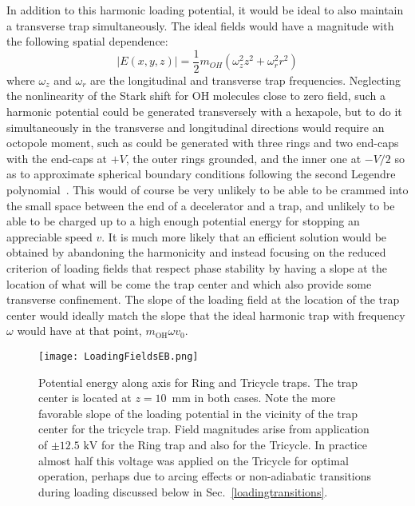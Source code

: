 In addition to this harmonic loading potential, it would be ideal to also maintain a transverse trap simultaneously. 
The ideal fields would have a magnitude with the following spatial dependence:
\begin{equation}
|E(x,y,z)| = \frac{1}{2}m_{OH}\left(\omega_z^2z^2 + \omega_r^2r^2\right)
\end{equation}
where $\omega_z$ and $\omega_r$ are the longitudinal and transverse trap frequencies.
Neglecting the nonlinearity of the Stark shift for OH molecules close to zero field, such a harmonic potential could be generated transversely with a hexapole, but to do it simultaneously in the transverse and longitudinal directions would require an octopole moment, such as could be generated with three rings and two end-caps with the end-caps at $+V$, the outer rings grounded, and the inner one at $-V/2$ so as to approximate spherical boundary conditions following the second Legendre polynomial~\cite{jackson1999classical}.
This would of course be very unlikely to be able to be crammed into the small space between the end of a decelerator and a trap, and unlikely to be able to be charged up to a high enough potential energy for stopping an appreciable speed $v$.
It is much more likely that an efficient solution would be obtained by abandoning the harmonicity and instead focusing on the reduced criterion of loading fields that respect phase stability by having a slope at the location of what will be come the trap center and which also provide some transverse confinement.
The slope of the loading field at the location of the trap center would ideally match the slope that the ideal harmonic trap with frequency $\omega$ would have at that point, $m_\text{OH}\omega v_0$.

\begin{figure}[t!]
\centering
\texttt{[image: LoadingFieldsEB.png]}
\caption[On-Axis Loading for Ring and Tricycle]{\label{loadingringtrike}
Potential energy along axis for Ring and Tricycle traps. The trap center is located at $z=10$~mm in both cases. Note the more favorable slope of the loading potential in the vicinity of the trap center for the tricycle trap. Field magnitudes arise from application of $\pm12.5\text{ kV}$ for the Ring trap and also for the Tricycle. In practice almost half this voltage was applied on the Tricycle for optimal operation, perhaps due to arcing effects or non-adiabatic transitions during loading discussed below in Sec.~\ref{loadingtransitions}.
}
\end{figure}

